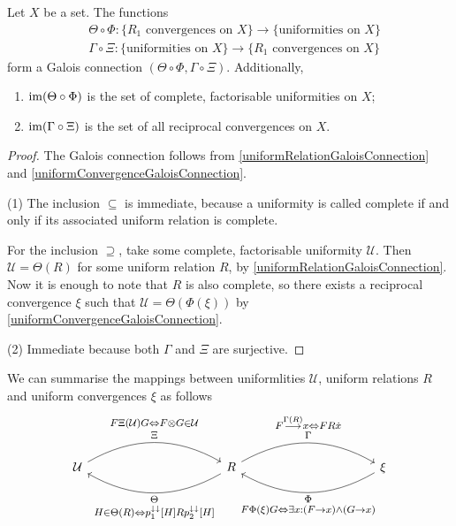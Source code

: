 \begin{corollary} \label{completeUniformGaloisConnection}
Let $X$ be a set. The functions
\begin{align*}
&\Theta \circ \Phi: \{\text{$R_1$ convergences on $X$}\} \to \{\text{uniformities on $X$}\} \\
&\Gamma\circ \Xi: \{\text{uniformities on $X$}\} \to \{\text{$R_1$ convergences on $X$}\}
\end{align*}
form a Galois connection $(\Theta \circ \Phi, \Gamma\circ \Xi)$. Additionally,
\begin{enumerate}
\item $\operatorname{im}(\Theta \circ \Phi)$ is the set of complete, factorisable uniformities on $X$;
\item $\operatorname{im}(\Gamma\circ \Xi)$ is the set of all reciprocal convergences on $X$.
\end{enumerate}
\end{corollary}
\begin{proof}
The Galois connection follows from \ref{uniformRelationGaloisConnection} and \ref{uniformConvergenceGaloisConnection}.

(1) The inclusion $\subseteq$ is immediate, because a uniformity is called complete if and only if its associated uniform relation is complete.

For the inclusion $\supseteq$, take some complete, factorisable uniformity $\mathcal{U}$. Then $\mathcal{U} = \Theta(R)$ for some uniform relation $R$, by \ref{uniformRelationGaloisConnection}. Now it is enough to note that $R$ is also complete, so there exists a reciprocal convergence $\xi$ such that $\mathcal{U} = \Theta(\Phi(\xi))$ by \ref{uniformConvergenceGaloisConnection}.

(2) Immediate because both $\Gamma$ and $\Xi$ are surjective.
\end{proof}

We can summarise the mappings between uniformlities $\mathcal{U}$, uniform relations $R$ and uniform convergences $\xi$ as follows
\[ \begin{tikzcd}[labels = {font=\large}, column sep=large]
\mathcal{U} \arrow[bend left, rrr, "\substack{F\mathrel{\Xi(\mathcal{U})}G \Leftrightarrow F\otimes G\in \mathcal{U} \vspace{0.1em} \\ \vspace{0.1em} \Xi}"] &&& \arrow[lll, bend left, "\substack{\Theta \vspace{0.1em} \\ H\in\Theta(R) \Leftrightarrow p_1^{\imf\imf}[H]\mathrel{R}p_2^{\imf\imf}[H]}"] R \arrow[rrr, bend left, "\substack{F\overset{\Gamma(R)}{\longrightarrow} x \Leftrightarrow F\mathrel{R}\pfilter{x} \vspace{0.1em} \\ \vspace{0.1em} \Gamma}"] &&& \arrow[lll, bend left, "\substack{\Phi \vspace{0.1em} \\ F\mathrel{\Phi(\xi)}G \Leftrightarrow \exists x: (F\to x)\land (G\to x)}"] \xi
\end{tikzcd} \]


